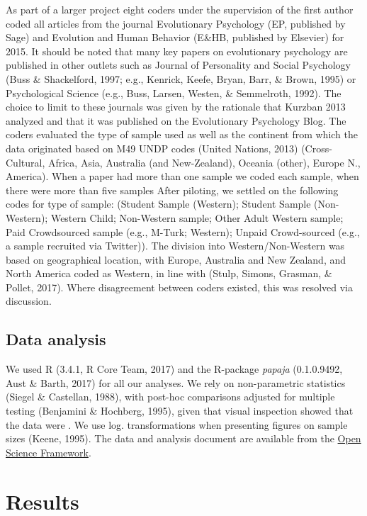 \documentclass[english,man]{apa6}
\newcounter{author}
\theoremstyle{definition}
\theoremstyle{definition}
\theoremstyle{remark}
\begin{document}
As part of a larger project eight coders under the supervision of the
first author coded all articles from the journal Evolutionary Psychology
(EP, published by Sage) and Evolution and Human Behavior (E\&HB,
published by Elsevier) for 2015. It should be noted that many key papers
on evolutionary psychology are published in other outlets such as
Journal of Personality and Social Psychology (Buss \& Shackelford, 1997;
e.g., Kenrick, Keefe, Bryan, Barr, \& Brown, 1995) or Psychological
Science (e.g., Buss, Larsen, Westen, \& Semmelroth, 1992). The choice to
limit to these journals was given by the rationale that Kurzban 2013
analyzed and that it was published on the Evolutionary Psychology Blog.
The coders evaluated the type of sample used as well as the continent
from which the data originated based on M49 UNDP codes (United Nations,
2013) (Cross-Cultural, Africa, Asia, Australia (and New-Zealand),
Oceania (other), Europe N., America). When a paper had more than one
sample we coded each sample, when there were more than five samples
After piloting, we settled on the following codes for type of sample:
(Student Sample (Western); Student Sample (Non-Western); Western Child;
Non-Western sample; Other Adult Western sample; Paid Crowdsourced sample
(e.g., M-Turk; Western); Unpaid Crowd-sourced (e.g., a sample recruited
via Twitter)). The division into Western/Non-Western was based on
geographical location, with Europe, Australia and New Zealand, and North
America coded as Western, in line with (Stulp, Simons, Grasman, \&
Pollet, 2017). Where disagreement between coders existed, this was
resolved via discussion.

\subsection{Data analysis}\label{data-analysis}

We used R (3.4.1, R Core Team, 2017) and the R-package \emph{papaja}
(0.1.0.9492, Aust \& Barth, 2017) for all our analyses. We rely on
non-parametric statistics (Siegel \& Castellan, 1988), with post-hoc
comparisons adjusted for multiple testing (Benjamini \& Hochberg, 1995),
given that visual inspection showed that the data were . We use log.
transformations when presenting figures on sample sizes (Keene, 1995).
The data and analysis document are available from the
\href{http://osf.io/pajhy}{Open Science Framework}.

\section{Results}\label{results}
\end{document}
